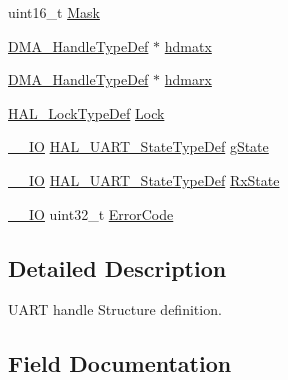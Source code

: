 \begin{DoxyCompactItemize}
\item 
uint16\+\_\+t \hyperlink{struct_u_a_r_t___handle_type_def_ab8dae64f3b86c2eb2b7a080fcdee3ef4}{Mask}
\item 
\hyperlink{group___d_m_a___exported___types_ga92b907d56a9c29b93d46782a7a04f91e}{D\+M\+A\+\_\+\+Handle\+Type\+Def} $\ast$ \hyperlink{struct_u_a_r_t___handle_type_def_a33e13c28b1a70e6164417abb026d7a22}{hdmatx}
\item 
\hyperlink{group___d_m_a___exported___types_ga92b907d56a9c29b93d46782a7a04f91e}{D\+M\+A\+\_\+\+Handle\+Type\+Def} $\ast$ \hyperlink{struct_u_a_r_t___handle_type_def_abd0aeec20298a55d89a440320e35634f}{hdmarx}
\item 
\hyperlink{stm32f0xx__hal__def_8h_ab367482e943333a1299294eadaad284b}{H\+A\+L\+\_\+\+Lock\+Type\+Def} \hyperlink{struct_u_a_r_t___handle_type_def_ad4cf225029dbefe8d3fe660c33b8bb6b}{Lock}
\item 
\hyperlink{core__sc300_8h_aec43007d9998a0a0e01faede4133d6be}{\+\_\+\+\_\+\+IO} \hyperlink{group___u_a_r_t___exported___types_gaf55d844a35379c204c90be5d1e8e50ba}{H\+A\+L\+\_\+\+U\+A\+R\+T\+\_\+\+State\+Type\+Def} \hyperlink{struct_u_a_r_t___handle_type_def_ab596705b6ce037e8debc149ccee148da}{g\+State}
\item 
\hyperlink{core__sc300_8h_aec43007d9998a0a0e01faede4133d6be}{\+\_\+\+\_\+\+IO} \hyperlink{group___u_a_r_t___exported___types_gaf55d844a35379c204c90be5d1e8e50ba}{H\+A\+L\+\_\+\+U\+A\+R\+T\+\_\+\+State\+Type\+Def} \hyperlink{struct_u_a_r_t___handle_type_def_a198c30da19a1529e1665bec6dc455815}{Rx\+State}
\item 
\hyperlink{core__sc300_8h_aec43007d9998a0a0e01faede4133d6be}{\+\_\+\+\_\+\+IO} uint32\+\_\+t \hyperlink{struct_u_a_r_t___handle_type_def_a123c5063e6a3b1901b2fbe5f88c53a7e}{Error\+Code}
\end{DoxyCompactItemize}


\subsection{Detailed Description}
U\+A\+RT handle Structure definition. 

\subsection{Field Documentation}
\mbox{\label{struct_u_a_r_t___handle_type_def_a4785c6c4b0e998062a50b706a739c6c5}} 

